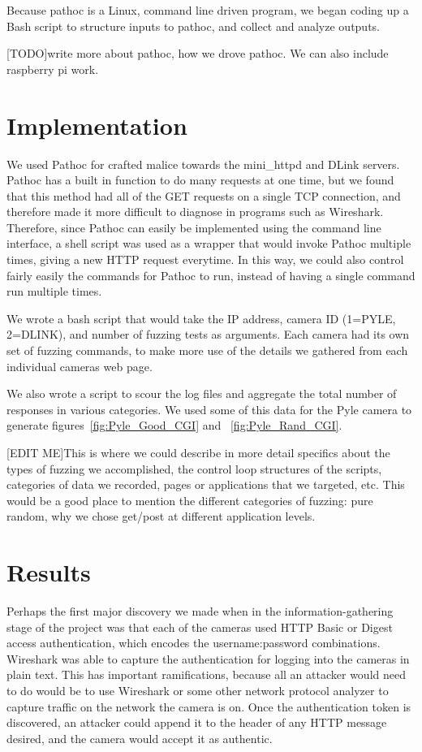 \documentclass[letterpaper,twocolumn,10pt]{article}
\begin{document}
Because pathoc is a Linux, command line driven program, we began coding up a Bash script to structure inputs to pathoc, and collect and analyze outputs. 


[TODO]write more about pathoc, how we drove pathoc. We can also include raspberry pi work. 



\section{Implementation}

We used Pathoc for crafted malice towards the mini\_httpd and DLink servers. Pathoc has a built in function to do many requests at one time, but we found that this method had all of the GET requests on a single TCP connection, and therefore made it more difficult to diagnose in programs such as Wireshark. Therefore, since Pathoc can easily be implemented using the command line interface, a shell script was used as a wrapper that would invoke Pathoc multiple times, giving a new HTTP request everytime. In this way, we could also control fairly easily the commands for Pathoc to run, instead of having a single command run multiple times.

We wrote a bash script that would take the IP address, camera ID (1=PYLE, 2=DLINK), and number of fuzzing tests as arguments. Each camera had its own set of fuzzing commands, to make more use of the details we gathered from each individual cameras web page.

We also wrote a script to scour the log files and aggregate the total number of responses in various categories. We used some of this data for the Pyle camera to generate figures~\ref{fig:Pyle_Good_CGI} and ~\ref{fig:Pyle_Rand_CGI}. 

 
[EDIT ME]This is where we could describe in more detail specifics about the types of fuzzing we accomplished, the control loop structures of the scripts, categories of data we recorded, pages or applications that we targeted, etc.
This would be a good place to mention the different categories of fuzzing: pure random, why we chose get/post at different application levels.



\section{Results}


Perhaps the first major discovery we made when in the information-gathering stage of the project was that each of the cameras used HTTP Basic or Digest access authentication, which encodes the username:password combinations. Wireshark was able to capture the authentication for logging into the cameras in plain text. This has important ramifications, because all an attacker would need to do would be to use Wireshark or some other network protocol analyzer to capture traffic on the network the camera is on. Once the authentication token is discovered, an attacker could append it to the header of any HTTP message desired, and the camera would accept it as authentic. 
\end{document}
